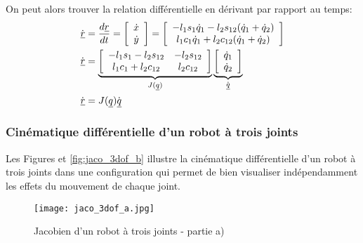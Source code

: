 On peut alors trouver la relation différentielle en dérivant par rapport au temps:
\begin{align}
\dot{\underline{r}} &= \frac{d\underline{r}}{dt} = \left[ \begin{array}{c} \dot{x} \\ \dot{y}  \end{array} \right]  = \left[ \begin{array}{c} 
-l_1 s_1 \dot{q}_1 - l_2 s_{12}( \dot{q}_1 + \dot{q}_2 ) \\ 
 l_1 c_1 \dot{q}_1 + l_2 c_{12}( \dot{q}_1 + \dot{q}_2 )  
\end{array} \right] \\
\dot{\underline{r}}  &= 
\underbrace{ \left[ \begin{array}{c c } 
-l_1 s_1 - l_2 s_{12} & - l_2 s_{12} \\ 
 l_1 c_1 + l_2 c_{12} &   l_2 c_{12}
\end{array} \right]  }_{ J(\underline{q}) } 
\underbrace{ \left[ \begin{array}{c} 
\dot{q}_1 \\ 
\dot{q}_2 
\end{array} \right]}_{ \dot{\underline{q}} } \\
\dot{\underline{r}}  &= J(\underline{q}) \dot{\underline{q}}
\end{align} 



\newpage
\subsubsection{Cinématique différentielle d'un robot à trois joints}
\label{sec:diffkinrobot3dofex}

Les Figures \pageref{fig:jaco_3dof_a} et \ref{fig:jaco_3dof_b} illustre la cinématique différentielle d'un robot à trois joints dans une configuration qui permet de bien visualiser indépendamment les effets du mouvement de chaque joint. 

\begin{figure}[H]
	\centering
		\texttt{[image: jaco\_3dof\_a.jpg]}
	\caption{Jacobien d'un robot à trois joints - partie a)}
	\label{fig:jaco_3dof_a}
\end{figure}

